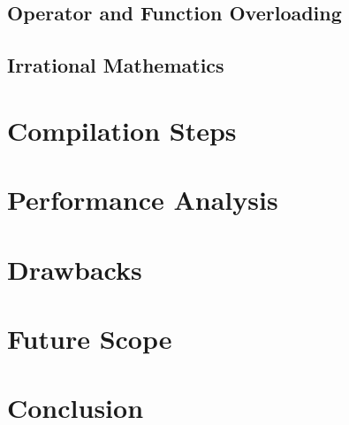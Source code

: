 \documentclass[12pt]{article}
\begin{document}
    \subsection{Operator and Function Overloading}
    \subsection{Irrational Mathematics}

    
    \section{Compilation Steps}
    \section{Performance Analysis}
    \section{Drawbacks}
    \section{Future Scope}
    \section{Conclusion}
\end{document}
